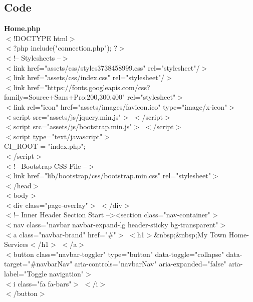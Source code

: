 \documentclass[12pt,a4paper]{report}
\begin{document}
\begin{titlepage}
{\subsection{Code }
\vspace{0.5cm}
\textbf{Home.php }\\
\vspace{0.5cm}
$<$!DOCTYPE html$>$\\
$<$?php include("connection.php");
?$>$\\



    $<$!-- Stylesheets --$>$\\
            $<$link href="assets/css/styles3738458999.css" rel="stylesheet"/$>$\\
            $<$link href="assets/css/index.css" rel="stylesheet"/$>$\\
    
    $<$link href="https://fonts.googleapis.com/css?family=Source+Sans+Pro:200,300,400" rel="stylesheet"$>$\\
  $<$link rel="icon" href="assets/images/favicon.ico" type="image/x-icon"$>$\\


    $<$script src="assets/js/jquery.min.js"$>$ $<$/script$>$\\
    $<$script src="assets/js/bootstrap.min.js"$>$ $<$/script$>$\\

    $<$script type="text/javascript"$>$\\
        CI\_ROOT = "index.php";\\
    $<$/script$>$\\
 $<$!-- Bootstrap CSS File --$>$\\
 $<$link href="lib/bootstrap/css/bootstrap.min.css" rel="stylesheet"$>$\\

$<$/head$>$\\
$<$body$>$\\
$<$div class="page-overlay"$>$ $<$/div$>$\\


$<$!-- Inner Header Section Start --><section class="nav-container"$>$\\       
$<$nav class="navbar navbar-expand-lg header-sticky bg-transparent"$>$\\
      $<$a class="navbar-brand" href="#"$>$ $<$h1$>$&nbsp;&nbsp;My Town Home-Services$<$/h1$>$ $<$/a$>$\\   
  $<$button class="navbar-toggler" type="button" data-toggle="collapse" data-target="#navbarNav" aria-controls="navbarNav" aria-expanded="false" aria-label="Toggle navigation"$>$\\
    $<$i class="fa fa-bars"$>$ $<$/i$>$\\
  $<$/button$>$\\

}
\end{titlepage}
\end{document}
